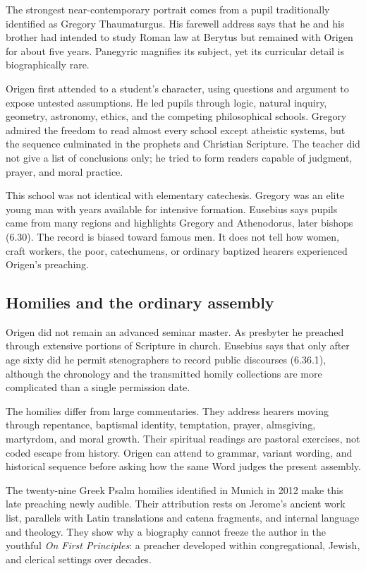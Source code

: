 The strongest near-contemporary portrait comes from a pupil traditionally
identified as Gregory Thaumaturgus. His farewell address says that he and his
brother had intended to study Roman law at Berytus but remained with Origen for
about five years. Panegyric magnifies its subject, yet its curricular detail is
biographically rare.

Origen first attended to a student's character, using questions and argument
to expose untested assumptions. He led pupils through logic, natural inquiry,
geometry, astronomy, ethics, and the competing philosophical schools. Gregory
admired the freedom to read almost every school except atheistic systems, but
the sequence culminated in the prophets and Christian Scripture. The teacher
did not give a list of conclusions only; he tried to form readers capable of
judgment, prayer, and moral practice.

This school was not identical with elementary catechesis. Gregory was an elite
young man with years available for intensive formation. Eusebius says pupils
came from many regions and highlights Gregory and Athenodorus, later bishops
(6.30). The record is biased toward famous men. It does not tell how women,
craft workers, the poor, catechumens, or ordinary baptized hearers experienced
Origen's preaching.

\subsection{Homilies and the ordinary assembly}

Origen did not remain an advanced seminar master. As presbyter he preached
through extensive portions of Scripture in church. Eusebius says that only
after age sixty did he permit stenographers to record public discourses
(6.36.1), although the chronology and the transmitted homily collections are
more complicated than a single permission date.

The homilies differ from large commentaries. They address hearers moving
through repentance, baptismal identity, temptation, prayer, almsgiving,
martyrdom, and moral growth. Their spiritual readings are pastoral exercises,
not coded escape from history. Origen can attend to grammar, variant wording,
and historical sequence before asking how the same Word judges the present
assembly.

The twenty-nine Greek Psalm homilies identified in Munich in 2012 make this
late preaching newly audible. Their attribution rests on Jerome's ancient
work list, parallels with Latin translations and catena fragments, and
internal language and theology. They show why a biography cannot freeze the
author in the youthful \emph{On First Principles}: a preacher developed within
congregational, Jewish, and clerical settings over decades.

